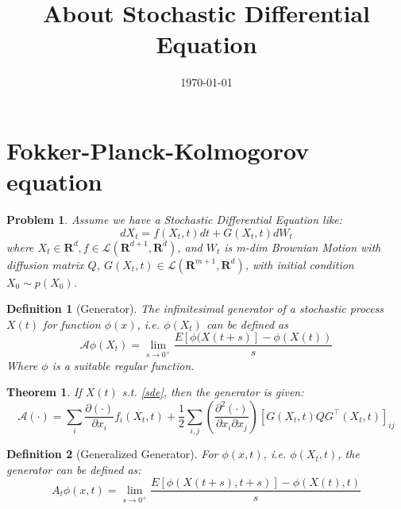 \documentclass{ctexart}
\title{About Stochastic Differential Equation}
\date{\today}
\newtheorem{theorem}{Theorem}
\newtheorem{definition}{Definition}
\newtheorem{problem}{Problem}
\begin{document}
\maketitle
\newpage
\section{Fokker-Planck-Kolmogorov equation}
\begin{problem}
Assume we have a Stochastic Differential Equation like:
\begin{equation}\label{sde}
    dX_t = f(X_t, t)dt + G(X_t, t)dW_t
\end{equation}
where $X_t\in \mathbf{R}^d,f\in \mathcal{L}(\mathbf{R}^{d+1}, \mathbf{R}^d)$, and $W_t$ is m-dim Brownian Motion with diffusion matrix $Q$, 
$G(X_t, t)\in \mathcal{L}(\mathbf{R}^{m+1}, \mathbf{R}^d)$, with initial condition $X_0\sim p(X_0)$.
\end{problem}
\begin{definition}[Generator]
    The infinitesimal generator of a stochastic process $X(t)$ for function $\phi(x)$, i.e. $\phi(X_t)$ can be defined as
    \begin{equation}
        \mathcal{A} \phi(X_t)=\lim _{s \rightarrow 0^{+}} \frac{E[\phi(X(t+s)]-\phi(X(t))}{s}
    \end{equation}
    Where  $\phi$  is a suitable regular function.
\end{definition}

\begin{theorem}
    If  $X(t)$  s.t. \ref{sde}, then the generator is given:
\begin{equation}
    \mathcal{A}(\cdot)=\sum_{i} \frac{\partial(\cdot)}{\partial x_{i}} f_{i}(X_t, t)+\frac{1}{2} \sum_{i, j}\left(\frac{\partial^{2}(\cdot)}{\partial x_{i} \partial x_{j}}\right)\left[G(X_t, t)Q G^{\top}(X_t, t)\right]_{i j}
\end{equation}
\end{theorem}

\begin{definition}[Generalized Generator]
    For $\phi(x, t)$, i.e. $\phi(X_t, t)$, the generator can be defined as:
    \begin{equation}
        A_{t} \phi(x, t)=\lim _{s \rightarrow 0^{+}} \frac{E[\phi(X(t+s), t+s)]-\phi(X(t), t)}{s}
    \end{equation}
\end{definition}
\end{document}
